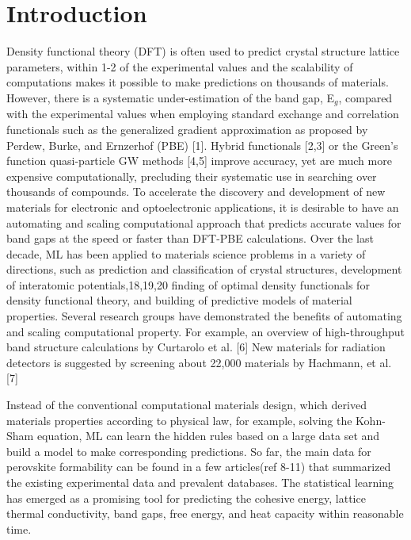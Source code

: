 \documentclass[%
twocolumn,
 amsmath,amssymb,
 aps, citeautoscript,
prb,
]{revtex4-1}
\begin{document}
\maketitle


\section{Introduction}
 
Density functional theory (DFT) is often used to predict crystal structure lattice parameters, within 1-2 of the experimental values and the scalability of computations makes it possible to make predictions on thousands of materials.  However, there is a systematic under-estimation of the band gap, E$_g$, compared with the experimental values when employing standard exchange and correlation functionals such as the generalized gradient approximation as proposed by Perdew, Burke, and Ernzerhof (PBE) [1].  Hybrid functionals  [2,3] or the Green’s function quasi-particle GW methods  [4,5] improve accuracy, yet are much more expensive computationally, precluding their systematic use in searching over thousands of compounds. To accelerate the discovery and development of new materials for electronic and optoelectronic applications, it is desirable to have an automating and scaling computational approach that predicts accurate values for band gaps at the speed or faster than DFT-PBE calculations. Over the last decade, ML has been applied to materials science problems in a variety of directions, such as prediction and classification of crystal structures, development of interatomic potentials,18,19,20 finding of optimal density functionals for density functional theory, and building of predictive models of material properties. Several research groups have demonstrated the benefits of automating and scaling computational property. For example, an overview of high-throughput band structure calculations by Curtarolo et al. [6] New materials for radiation detectors is suggested by screening about 22,000 materials by Hachmann, et al. [7]

Instead of the conventional computational materials design, which derived materials properties according to physical law, for example, solving the Kohn-Sham equation, ML can learn the hidden rules based on a large data set and build a model to make corresponding predictions. So far, the main data for perovskite formability can be found in a few articles(ref 8-11) that summarized the existing experimental data and prevalent databases. The statistical learning has emerged as a promising tool for predicting the cohesive energy, lattice thermal conductivity, band gaps, free energy, and heat capacity within reasonable time. 
\end{document}
